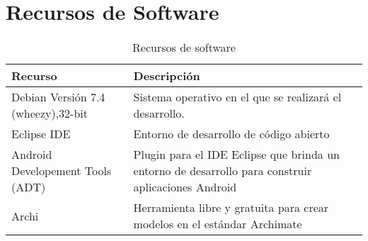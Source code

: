 \section{Recursos de Software}
  \begin{table}[!htb]
    \caption{Recursos de software}
    \begin{center}
      \begin{tabular}{|p{5cm}|p{7cm}|}
        \hline
        Recurso & Descripción\\
        \hline \hline
        Debian Versión 7.4 (wheezy),32-bit & Sistema operativo en el que se realizará el desarrollo. \\
        \hline
        Eclipse IDE & Entorno de desarrollo de código abierto\\
        \hline
        Android Developement Tools (ADT) & Plugin para el IDE Eclipse que brinda un entorno de desarrollo para construir aplicaciones Android\\
        \hline
        Archi & Herramienta libre y gratuita para crear modelos en el estándar Archimate\\
        \hline
      \end{tabular}
    \end{center}
  \end{table} 

